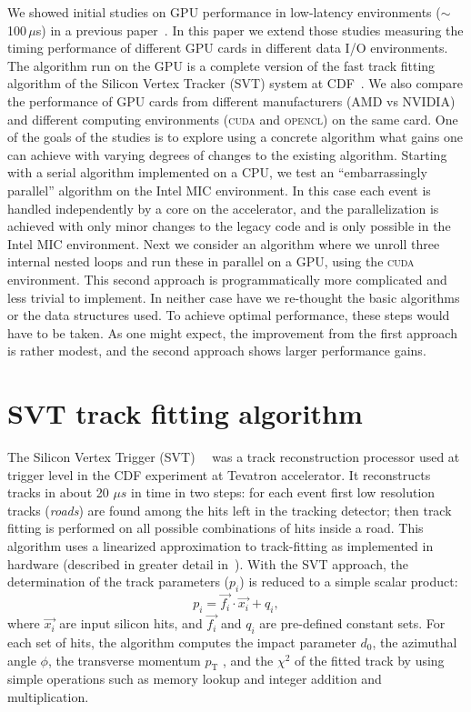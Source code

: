 \documentclass[letterpaper]{jpconf}
\begin{document}
We showed initial studies on GPU performance in low-latency
environments ($\sim$100\,$\mu$s) in a previous paper~\cite{TIPP2011,
  NSS2012}.  In this paper we extend those studies measuring the
timing performance of different GPU cards in different data I/O
environments. The algorithm run on the GPU is a complete version of
the fast track fitting algorithm of the Silicon Vertex Tracker (SVT)
system at CDF~\cite{SVT1}. We also compare the performance of GPU
cards from different manufacturers (AMD vs NVIDIA) and different
computing environments (\textsc{cuda} and \textsc{opencl}) on the same
card. 
One of the goals of the studies is to explore using a concrete
algorithm what gains one can achieve with varying degrees of changes
to the existing algorithm. Starting with a serial algorithm
implemented on a CPU, we test an ``embarrassingly parallel'' algorithm
on the Intel MIC environment. In this case each event is handled
independently by a core on the accelerator, and the parallelization is
achieved with only minor changes to the legacy code and is only
possible in the Intel MIC environment. Next we consider an algorithm
where we unroll three internal nested loops and run these in parallel
on a GPU, using the \textsc{cuda} environment. This second approach is
programmatically more complicated and less trivial to implement. In
neither case have we re-thought the basic algorithms or the data
structures used. To achieve optimal performance, these steps would
have to be taken.  As one might expect, the improvement from the first
approach is rather modest, and the second approach shows larger
performance gains.

\section{SVT track fitting algorithm}
The Silicon Vertex Trigger (SVT)~\cite{bib_SVT1}~\cite{bib_SVT2} was a 
track reconstruction processor used at 
trigger level in the CDF experiment at Tevatron accelerator. It reconstructs 
tracks in about 20 $\mu s$ in time in two steps: for each event 
first low resolution tracks (\textit{roads}) are found among the hits left 
in the tracking detector; then track fitting is performed on 
all possible combinations of hits inside a road. 
This algorithm uses a linearized approximation to track-fitting as 
implemented in hardware (described in greater detail in~\cite{bib_SVT3}). 
With the SVT approach, the determination of the track parameters 
($p_i$) is reduced to a simple scalar product:
\[
p_i = \vec{f_i} \cdot \vec{x_i} + q_i,
\]
where $\vec{x_i}$ are input silicon hits, and $\vec{f_i}$ and $q_i$ are 
pre-defined constant sets. For each set of hits, the algorithm
computes the impact parameter $d_0$, the azimuthal angle $\phi$, 
the transverse momentum $p_\mathrm{T}$ , and the $\chi^2$ of the
fitted track by using simple operations such as memory lookup and 
integer addition and multiplication. 
\end{document}
